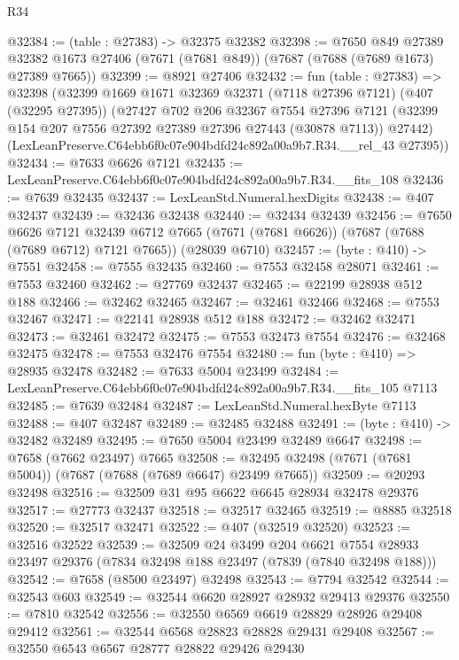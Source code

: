 \begin{lexlean}{R34}
\begin{coremodule}
@32384 := (table : @27383) -> @32375 @32382
@32398 := @7650
    @849
    @27389
    @32382
    @1673
    @27406
    (@7671 (@7681 @849))
    (@7687 (@7688 (@7689 @1673) @27389 @7665))
@32399 := @8921 @27406
@32432 := fun (table : @27383) =>
  @32398
    (@32399
      @1669
      @1671
      @32369
      @32371
      (@7118 @27396 @7121)
      (@407 (@32295 @27395))
      (@27427
        @702
        @206
        @32367
        @7554
        @27396
        @7121
        (@32399 @154 @207 @7556 @27392 @27389 @27396 @27443 (@30878 @7113))
        @27442)
      (LexLeanPreserve.C64ebb6f0c07e904bdfd24c892a00a9b7.R34.__rel_43 @27395))
@32434 := @7633 @6626 @7121
@32435 := LexLeanPreserve.C64ebb6f0c07e904bdfd24c892a00a9b7.R34.__fits_108
@32436 := @7639 @32435
@32437 := LexLeanStd.Numeral.hexDigits
@32438 := @407 @32437
@32439 := @32436 @32438
@32440 := @32434 @32439
@32456 := @7650
    @6626
    @7121
    @32439
    @6712
    @7665
    (@7671 (@7681 @6626))
    (@7687 (@7688 (@7689 @6712) @7121 @7665))
    (@28039 @6710)
@32457 := (byte : @410) -> @7551
@32458 := @7555 @32435
@32460 := @7553 @32458 @28071
@32461 := @7553 @32460
@32462 := @27769 @32437
@32465 := @22199 @28938 @512 @188
@32466 := @32462 @32465
@32467 := @32461 @32466
@32468 := @7553 @32467
@32471 := @22141 @28938 @512 @188
@32472 := @32462 @32471
@32473 := @32461 @32472
@32475 := @7553 @32473 @7554
@32476 := @32468 @32475
@32478 := @7553 @32476 @7554
@32480 := fun (byte : @410) => @28935 @32478
@32482 := @7633 @5004 @23499
@32484 := LexLeanPreserve.C64ebb6f0c07e904bdfd24c892a00a9b7.R34.__fits_105 @7113
@32485 := @7639 @32484
@32487 := LexLeanStd.Numeral.hexByte @7113
@32488 := @407 @32487
@32489 := @32485 @32488
@32491 := (byte : @410) -> @32482 @32489
@32495 := @7650 @5004 @23499 @32489 @6647
@32498 := @7658 (@7662 @23497) @7665
@32508 := @32495 @32498 (@7671 (@7681 @5004)) (@7687 (@7688 (@7689 @6647) @23499 @7665))
@32509 := @20293 @32498
@32516 := @32509 @31 @95 @6622 @6645 @28934 @32478 @29376
@32517 := @27773 @32437
@32518 := @32517 @32465
@32519 := @8885 @32518
@32520 := @32517 @32471
@32522 := @407 (@32519 @32520)
@32523 := @32516 @32522
@32539 := @32509
    @24
    @3499
    @204
    @6621
    @7554
    @28933
    @23497
    @29376
    (@7834 @32498 @188 @23497 (@7839 (@7840 @32498 @188)))
@32542 := @7658 (@8500 @23497) @32498
@32543 := @7794 @32542
@32544 := @32543 @603
@32549 := @32544 @6620 @28927 @28932 @29413 @29376
@32550 := @7810 @32542
@32556 := @32550 @6569 @6619 @28829 @28926 @29408 @29412
@32561 := @32544 @6568 @28823 @28828 @29431 @29408
@32567 := @32550 @6543 @6567 @28777 @28822 @29426 @29430

\end{coremodule}
\end{lexlean}
